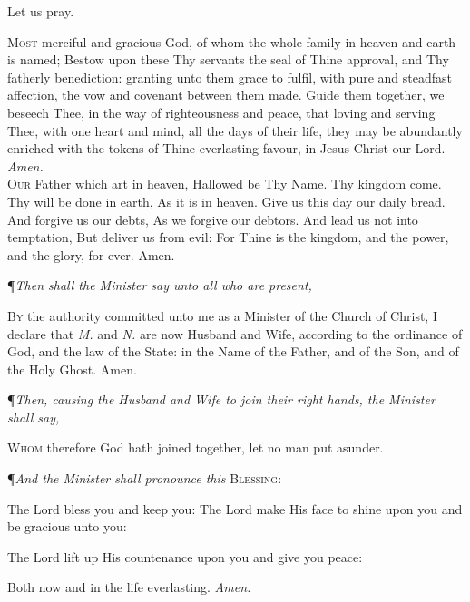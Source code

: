{\centering Let us pray. \par}
\vspace{1ex}

\lettrine{M}{ost} merciful and gracious God, of whom the whole
family in heaven and earth is named; Bestow upon
these Thy servants the seal of Thine approval, and Thy
fatherly benediction: granting unto them grace to fulfil,
with pure and steadfast affection, the vow and covenant
between them made. Guide them together, we beseech
Thee, in the way of righteousness and peace, that loving
and serving Thee, with one heart and mind, all the days
of their life, they may be abundantly enriched with the
tokens of Thine everlasting favour, in Jesus Christ our
Lord.
\textit{Amen.} \\

\lettrine{O}{ur} Father which art in heaven, Hallowed be Thy Name.
Thy kingdom come. Thy will be done in earth, As it
is in heaven. Give us this day our daily bread. And forgive us our debts, As we forgive our debtors. And lead
us not into temptation, But deliver us from evil: For Thine
is the kingdom, and the power, and the glory, for ever.
Amen. \\

{\centering\P\textit{Then shall the Minister say unto all who are present,}\par}
\vspace{1ex}

\lettrine{B}{y} the authority committed unto me as a Minister of the
Church of Christ, I declare that \textit{M.} and \textit{N.} are now
Husband and Wife, according to the ordinance of God, and
the law of the State: in the Name of the Father, and of the
Son, and of the Holy Ghost. Amen. \\

{\centering\P\textit{Then, causing the Husband and Wife to join their right hands,
the Minister shall say,}\par}
\vspace{1ex}

\lettrine{W}{hom} therefore God hath joined together, let no man
put asunder. \\

{\centering\P\textit{And the Minister shall pronounce this} \textsc{Blessing:}\par}
\vspace{1ex}

The Lord bless you and keep you: The Lord make His
face to shine upon you and be gracious unto you:

The Lord lift up His countenance upon you and give you
peace:

Both now and in the life everlasting. \textit{Amen.}

